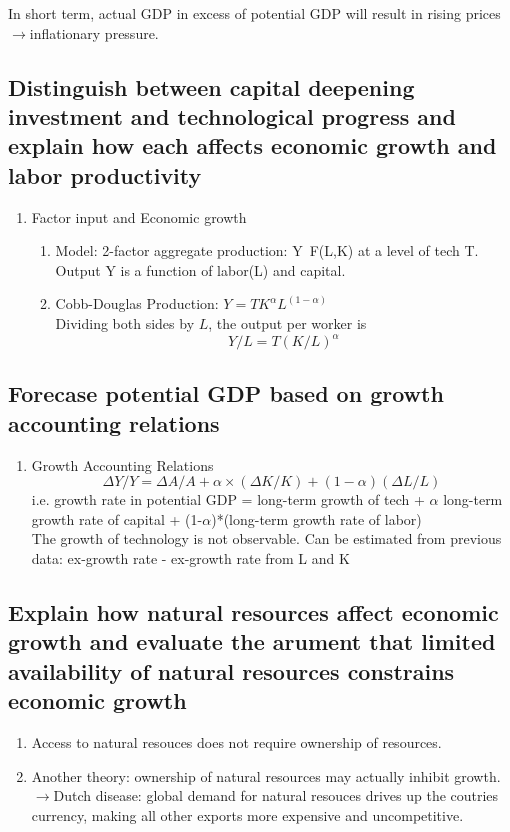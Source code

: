 \documentclass{article}
\newcommand{\be}{\begin{enumerate}}
\newcommand{\ee}{\end{enumerate}}
\newcommand{\ra}{$\rightarrow$}
\begin{document}
In short term, actual GDP in excess of potential GDP will result in rising prices \ra inflationary pressure.
\subsection{Distinguish between capital deepening investment and technological progress and explain
how each affects economic growth and labor productivity}
\be
    \item Factor input and Economic growth
        \be
            \item Model: 2-factor aggregate production: Y~F(L,K) at a level of tech T.
                Output Y is a function of labor(L) and capital.
            \item Cobb-Douglas Production: $Y=TK^\alpha L^{(1-\alpha)}$
                \\Dividing both sides by $L$, the output per worker is 
                $$
                    Y/L=T(K/L)^\alpha
                $$
        \ee
\ee
\subsection{Forecase potential GDP based on growth accounting relations}
\be
    \item Growth Accounting Relations
        $$
        \Delta Y/Y=\Delta A/A+\alpha\times(\Delta K/K)+(1-\alpha)(\Delta L/L)
        $$
        i.e. growth rate in potential GDP = long-term growth of tech 
        + $\alpha$ long-term growth rate of capital
         + (1-$\alpha$)*(long-term growth rate of labor)
        \\ The growth of technology is not observable. Can be estimated from previous
        data: ex-growth rate - ex-growth rate from L and K
\ee
\subsection{Explain how natural resources affect economic growth and evaluate the arument
that limited availability of natural resources constrains economic growth}
\be
    \item Access to natural resouces does not require ownership of resources.
    \item Another theory: ownership of natural resources may actually inhibit growth. 
        \ra Dutch disease: global demand for natural resouces  drives up the coutries
        currency, making all other exports more expensive and uncompetitive.
\ee
\end{document}
